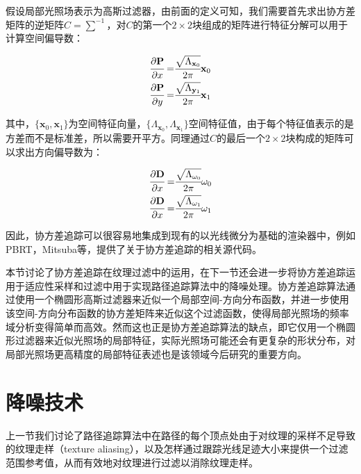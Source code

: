 假设局部光照场表示为高斯过滤器，由前面的定义可知，我们需要首先求出协方差矩阵的逆矩阵$C=\sum^{-1}$，对$C$的第一个$2\times 2$块组成的矩阵进行特征分解可以用于计算空间偏导数：

\begin{equation}
	\begin{aligned}
		 \cfrac{{\rm \partial}\mathbf{P}}{{\rm \partial} x}=& \cfrac{\sqrt{{\Lambda_{\mathbf{x}_0} }}}{2\pi}\mathbf{x}_0 \\
		 \cfrac{{\rm \partial}\mathbf{P}}{{\rm \partial} y}=& \cfrac{\sqrt{{\Lambda_{\mathbf{y}_1}}}}{2\pi}\mathbf{x}_1 \\
	\end{aligned}
\end{equation}

\noindent 其中，$\{\mathbf{x}_0,\mathbf{x}_1\}$为空间特征向量，$\{\Lambda_{\mathbf{x}_0},\Lambda_{\mathbf{x}_1}\}$空间特征值，由于每个特征值表示的是方差而不是标准差，所以需要开平方。同理通过$C$的最后一个$2\times 2$块构成的矩阵可以求出方向偏导数为：

\begin{equation}
	\begin{aligned}
		 \cfrac{{\rm \partial}\mathbf{D}}{{\rm \partial} x}=& \cfrac{\sqrt{{\Lambda_{\omega_0}}}}{2\pi}\omega_0 \\
		 \cfrac{{\rm \partial}\mathbf{D}}{{\rm \partial} x}=& \cfrac{\sqrt{{\Lambda_{\omega_1}}}}{2\pi}\omega_1 \\
	\end{aligned}
\end{equation}

\noindent 因此，协方差追踪可以很容易地集成到现有的以光线微分为基础的渲染器中，例如PBRT，Mitsuba等，\cite{a:Covariancetracingsourcecode}提供了关于协方差追踪的相关源代码。

本节讨论了协方差追踪在纹理过滤中的运用，在下一节还会进一步将协方差追踪运用于适应性采样和过滤中用于实现路径追踪算法中的降噪处理。协方差追踪算法通过使用一个椭圆形高斯过滤器来近似一个局部空间-方向分布函数，并进一步使用该空间-方向分布函数的协方差矩阵来近似这个过滤函数，使得局部光照场的频率域分析变得简单而高效。然而这也正是协方差追踪算法的缺点，即它仅用一个椭圆形过滤器来近似光照场的局部特征，实际光照场可能还会有更复杂的形状分布，对局部光照场更高精度的局部特征表述也是该领域今后研究的重要方向。







\section{降噪技术}\label{sec:pt-denoising}
上一节我们讨论了路径追踪算法中在路径的每个顶点处由于对纹理的采样不足导致的纹理走样（texture aliasing），以及怎样通过跟踪光线足迹大小来提供一个过滤范围参考值，从而有效地对纹理进行过滤以消除纹理走样。

